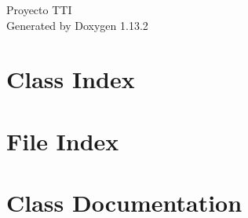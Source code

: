 \documentclass[twoside]{book}
\newcommand{\+}{\discretionary{\mbox{\scriptsize$\hookleftarrow$}}{}{}}
\newcommand{\clearemptydoublepage}{%
    \newpage{\pagestyle{empty}\cleardoublepage}%
  }
\begin{document}
  \raggedbottom
    \hypersetup{pageanchor=false,
                bookmarksnumbered=true,
                pdfencoding=unicode
               }
  \begin{titlepage}
  \vspace*{7cm}
  \begin{center}%
  {\Large Proyecto TTI}\\
  \vspace*{1cm}
  {\large Generated by Doxygen 1.13.2}\\
  \end{center}
  \end{titlepage}
  \clearemptydoublepage
  \tableofcontents
  \clearemptydoublepage
  \hypersetup{pageanchor=true}

\chapter{Class Index}

\chapter{File Index}

\chapter{Class Documentation}




\end{document}
